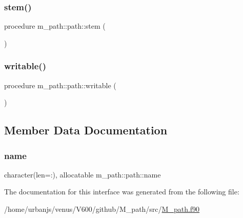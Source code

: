 \subsubsection{\texorpdfstring{stem()}{stem()}}
{\footnotesize\ttfamily procedure m\+\_\+path\+::path\+::stem (\begin{DoxyParamCaption}{ }\end{DoxyParamCaption})\hspace{0.3cm}{\ttfamily [private]}}

\mbox{\label{structm__path_1_1path_a2769cf5ecff4b5dc0a6b82bd79a18c37}} 
\subsubsection{\texorpdfstring{writable()}{writable()}}
{\footnotesize\ttfamily procedure m\+\_\+path\+::path\+::writable (\begin{DoxyParamCaption}{ }\end{DoxyParamCaption})\hspace{0.3cm}{\ttfamily [private]}}



\subsection{Member Data Documentation}
\mbox{\label{structm__path_1_1path_a1d9f6aad306106e1032d44c175b80dc4}} 
\subsubsection{\texorpdfstring{name}{name}}
{\footnotesize\ttfamily character(len=\+:), allocatable m\+\_\+path\+::path\+::name\hspace{0.3cm}{\ttfamily [private]}}



The documentation for this interface was generated from the following file\+:\begin{DoxyCompactItemize}
\item 
/home/urbanjs/venus/\+V600/github/\+M\+\_\+path/src/\mbox{\hyperlink{M__path_8f90}{M\+\_\+path.\+f90}}\end{DoxyCompactItemize}
